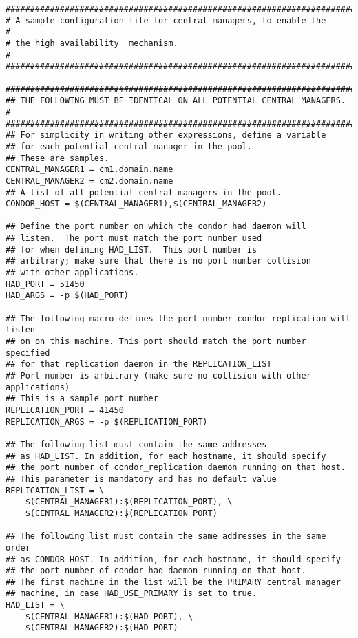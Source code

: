 \footnotesize
\begin{verbatim}
##########################################################################
# A sample configuration file for central managers, to enable the        #
# the high availability  mechanism.                                      #
##########################################################################

#########################################################################
## THE FOLLOWING MUST BE IDENTICAL ON ALL POTENTIAL CENTRAL MANAGERS.   # 
#########################################################################
## For simplicity in writing other expressions, define a variable
## for each potential central manager in the pool. 
## These are samples.
CENTRAL_MANAGER1 = cm1.domain.name
CENTRAL_MANAGER2 = cm2.domain.name
## A list of all potential central managers in the pool.
CONDOR_HOST = $(CENTRAL_MANAGER1),$(CENTRAL_MANAGER2)

## Define the port number on which the condor_had daemon will
## listen.  The port must match the port number used
## for when defining HAD_LIST.  This port number is
## arbitrary; make sure that there is no port number collision
## with other applications.
HAD_PORT = 51450
HAD_ARGS = -p $(HAD_PORT)

## The following macro defines the port number condor_replication will listen
## on on this machine. This port should match the port number specified
## for that replication daemon in the REPLICATION_LIST
## Port number is arbitrary (make sure no collision with other applications)
## This is a sample port number
REPLICATION_PORT = 41450
REPLICATION_ARGS = -p $(REPLICATION_PORT)

## The following list must contain the same addresses
## as HAD_LIST. In addition, for each hostname, it should specify 
## the port number of condor_replication daemon running on that host.
## This parameter is mandatory and has no default value
REPLICATION_LIST = \
	$(CENTRAL_MANAGER1):$(REPLICATION_PORT), \
	$(CENTRAL_MANAGER2):$(REPLICATION_PORT)

## The following list must contain the same addresses in the same order 
## as CONDOR_HOST. In addition, for each hostname, it should specify 
## the port number of condor_had daemon running on that host.
## The first machine in the list will be the PRIMARY central manager
## machine, in case HAD_USE_PRIMARY is set to true.
HAD_LIST = \
	$(CENTRAL_MANAGER1):$(HAD_PORT), \
	$(CENTRAL_MANAGER2):$(HAD_PORT)


\end{verbatim}

